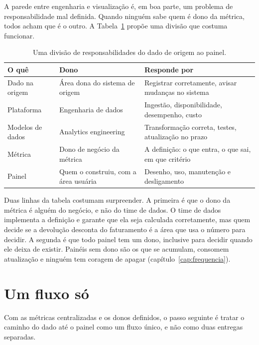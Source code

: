 A parede entre engenharia e visualização é, em boa parte, um problema de responsabilidade mal
definida. Quando ninguém sabe quem é dono da métrica, todos acham que é o outro. A
Tabela~\ref{tab:donos} propõe uma divisão que costuma funcionar.

\begin{table}[htbp]
  \centering
  \caption{Uma divisão de responsabilidades do dado de origem ao painel.}
  \label{tab:donos}
  \small
  \begin{tabularx}{\textwidth}{@{}>{\raggedright\arraybackslash}p{}
      >{\raggedright\arraybackslash}p{}>{\raggedright\arraybackslash}X@{}}
    \toprule
    O quê & Dono & Responde por \\
    \midrule
    Dado na origem & Área dona do sistema de origem & Registrar corretamente, avisar mudanças no sistema \\
    \addlinespace
    Plataforma & Engenharia de dados & Ingestão, disponibilidade, desempenho, custo \\
    \addlinespace
    Modelos de dados & Analytics engineering & Transformação correta, testes, atualização no prazo \\
    \addlinespace
    Métrica & Dono de negócio da métrica & A definição: o que entra, o que sai, em que critério \\
    \addlinespace
    Painel & Quem o construiu, com a área usuária & Desenho, uso, manutenção e desligamento \\
    \bottomrule
  \end{tabularx}
\end{table}

Duas linhas da tabela costumam surpreender. A primeira é que o dono da métrica é alguém do
negócio, e não do time de dados. O time de dados implementa a definição e garante que ela seja
calculada corretamente, mas quem decide se a devolução desconta do faturamento é a área que
usa o número para decidir. A segunda é que todo painel tem um dono, inclusive para decidir
quando ele deixa de existir. Painéis sem dono são os que se acumulam, consomem atualização e
ninguém tem coragem de apagar (capítulo~\ref{cap:frequencia}).

\section{Um fluxo só}
\label{sec:fluxo-unico}

Com as métricas centralizadas e os donos definidos, o passo seguinte é tratar o caminho do dado
até o painel como um fluxo único, e não como duas entregas separadas.


